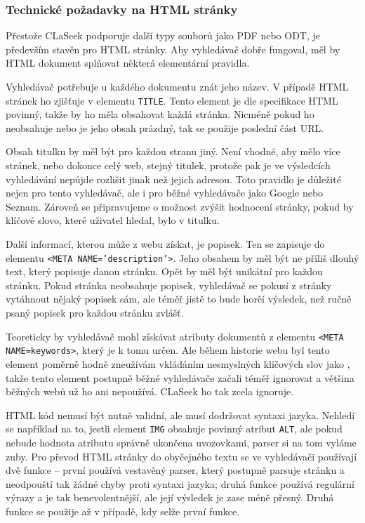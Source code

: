 \documentclass[12pt]{article}
\newcommand{\name}{CLaSeek}
\newcommand{\code}[1]{\texttt{#1}}
\newcommand{\sssection}[1]{\subsubsection{#1}}
\begin{document}
\sssection{Technické požadavky na HTML stránky}
Přestože \name{} podporuje další typy souborů jako PDF nebo ODT, je především stavěn pro HTML stránky. Aby vyhledávač dobře fungoval, měl by HTML dokument splňovat některá elementární pravidla. 

Vyhledávač potřebuje u každého dokumentu znát jeho název. V případě HTML stránek ho zjišťuje v elementu \code{TITLE}. Tento element je dle specifikace HTML povinný, takže by ho měla obsahovat každá stránka. Nicméně pokud ho neobsahuje nebo je jeho obsah prázdný, tak se použije poslední část URL. 

Obsah titulku by měl být pro každou stranu jiný. Není vhodné, aby mělo více stránek, nebo dokonce celý web, stejný titulek, protože pak je ve výsledcích vyhledávání nepůjde rozlišit jinak než jejich adresou. Toto pravidlo je důležité nejen pro tento vyhledávač, ale i pro běžné vyhledávače jako Google nebo Seznam. Zároveň se připravujeme o možnost zvýšit hodnocení stránky, pokud by klíčové slovo, které uživatel hledal, bylo v titulku. 

Další informací, kterou může z webu získat, je popisek. Ten se zapisuje do elementu \code{<META NAME='description'>}. Jeho obsahem by měl být ne příliš dlouhý text, který popisuje danou stránku. Opět by měl být unikátní pro každou stránku. Pokud stránka neobsahuje popisek, vyhledávač se pokusí z stránky vytáhnout nějaký popisek sám, ale téměř jistě to bude horěí výsledek, než ručně psaný popisek pro každou stránku zvlášť. 

Teoreticky by vyhledávač mohl získávat atributy dokumentů z elementu \code{<META NAME=keywords>}, který je k tomu určen. Ale během historie webu byl tento element poměrně hodně zneužívám vkládáním nesmyslných klíčových slov jako , takže tento element postupně běžné vyhledávače začali téměř ignorovat a většina běžných webů už ho ani nepoužívá. \name{} ho tak zcela ignoruje. 

HTML kód nemusí být nutně validní, ale musí dodržovat syntaxi jazyka. Nehledí se například na to, jestli element \code{IMG} obsahuje povinný atribut \code{ALT}, ale pokud nebude hodnota atributu správně ukončena uvozovkami, parser si na tom vyláme zuby. Pro převod HTML stránky do obyčejného textu se ve vyhledávači používají dvě funkce -- první používá vestavěný parser, který postupně parsuje stránku a neodpouští tak žádné chyby proti syntaxi jazyka; druhá funkce používá regulární výrazy a je tak benevolentnější, ale její výsledek je zase méně přesný. Druhá funkce se použije až v případě, kdy selže první funkce.
\end{document}
